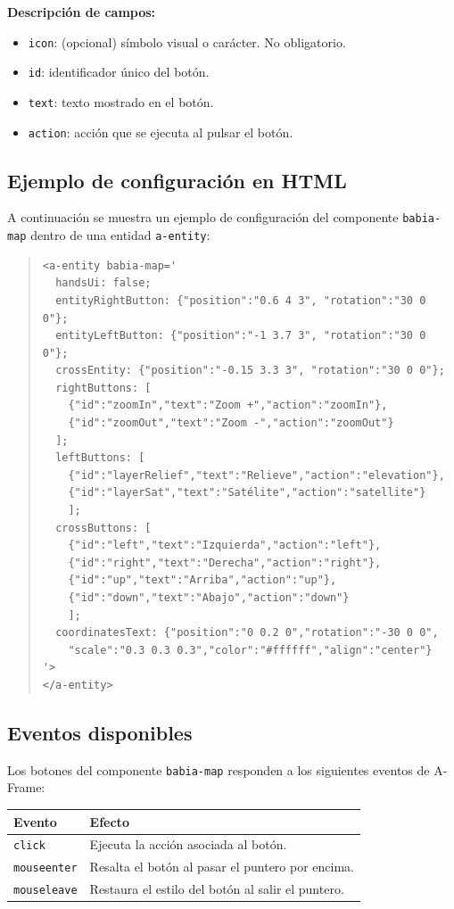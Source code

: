 \documentclass[a4paper, 12pt]{book}
\begin{document}
\textbf{Descripción de campos:}

\begin{itemize}
  \item \texttt{icon}: (opcional) símbolo visual o carácter. No obligatorio.
  \item \texttt{id}: identificador único del botón.
  \item \texttt{text}: texto mostrado en el botón.
  \item \texttt{action}: acción que se ejecuta al pulsar el botón.
\end{itemize}

\subsection*{Ejemplo de configuración en HTML}

A continuación se muestra un ejemplo de configuración del componente \texttt{babia-map} dentro de una entidad \texttt{a-entity}:

\begin{quote}
\small
\begin{verbatim}
<a-entity babia-map='
  handsUi: false;
  entityRightButton: {"position":"0.6 4 3", "rotation":"30 0 0"};
  entityLeftButton: {"position":"-1 3.7 3", "rotation":"30 0 0"};
  crossEntity: {"position":"-0.15 3.3 3", "rotation":"30 0 0"};
  rightButtons: [
    {"id":"zoomIn","text":"Zoom +","action":"zoomIn"},
    {"id":"zoomOut","text":"Zoom -","action":"zoomOut"}
  ];
  leftButtons: [
    {"id":"layerRelief","text":"Relieve","action":"elevation"},
    {"id":"layerSat","text":"Satélite","action":"satellite"}
    ];
  crossButtons: [
    {"id":"left","text":"Izquierda","action":"left"},
    {"id":"right","text":"Derecha","action":"right"},
    {"id":"up","text":"Arriba","action":"up"},
    {"id":"down","text":"Abajo","action":"down"}
    ];
  coordinatesText: {"position":"0 0.2 0","rotation":"-30 0 0",
    "scale":"0.3 0.3 0.3","color":"#ffffff","align":"center"}
'>
</a-entity>
\end{verbatim}
\end{quote}

\subsection*{Eventos disponibles}

Los botones del componente \texttt{babia-map} responden a los siguientes eventos de A-Frame:

\begin{table}[H]
\centering
\begin{tabular}{|l|p{10cm}|}
\hline
\textbf{Evento} & \textbf{Efecto} \\
\hline
\texttt{click} & Ejecuta la acción asociada al botón. \\
\texttt{mouseenter} & Resalta el botón al pasar el puntero por encima. \\
\texttt{mouseleave} & Restaura el estilo del botón al salir el puntero. \\
\hline
\end{tabular}
\end{table}
\end{document}
